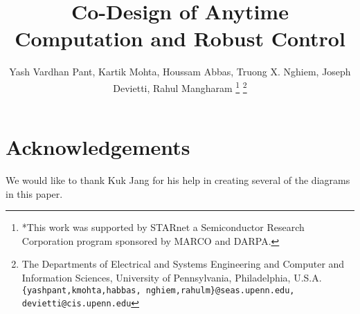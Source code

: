 \documentclass[final,letterpaper, 10 pt, conference]{ieeeconf}  %
\title{\LARGE \bf
Co-Design of Anytime Computation and Robust Control
}
\author{Yash Vardhan Pant, Kartik Mohta, Houssam Abbas, Truong X. Nghiem, Joseph Devietti, Rahul Mangharam%
	\thanks{*This work was supported by STARnet a Semiconductor Research
		Corporation program sponsored by MARCO and DARPA.}%
	\thanks{The Departments of Electrical and Systems Engineering and Computer and Information Sciences, University of Pennsylvania, Philadelphia, U.S.A.
		{\tt\small
			\{yashpant,kmohta,habbas,
			nghiem,rahulm\}@seas.upenn.edu, devietti@cis.upenn.edu}}%
}
\begin{document}
\maketitle
\thispagestyle{empty}
\pagestyle{empty}











\section*{Acknowledgements}
We would like to thank Kuk Jang for his help in creating several of the diagrams in this paper.
%


\end{document}
